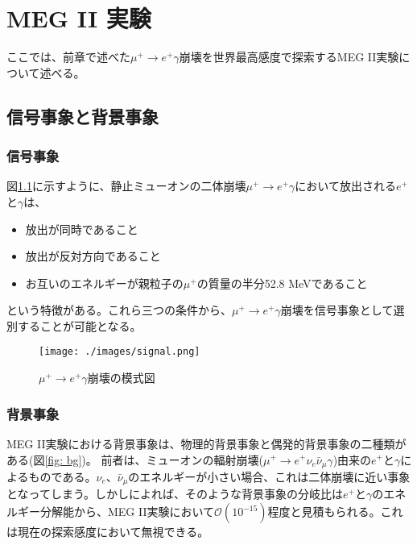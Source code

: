 \documentclass[Yonemoto_master.tex]{subfiles}
\begin{document}
\chapter{MEG II 実験}
ここでは、前章で述べた$\mu^+ \to e^+ \gamma$崩壊を世界最高感度で探索するMEG II実験について述べる。

\section{信号事象と背景事象}

\subsection{信号事象}
図\ref{fig: signal}に示すように、静止ミューオンの二体崩壊$\mu^+ \to e^+ \gamma$において放出される$e^+$と$\gamma$は、

\begin{itemize}
\item 放出が同時であること
\item 放出が反対方向であること
\item お互いのエネルギーが親粒子の$\mu^+$の質量の半分52.8 MeVであること
\end{itemize}

という特徴がある。これら三つの条件から、$\mu^+ \to e^+ \gamma$崩壊を信号事象として選別することが可能となる。
\begin{figure}[h]
 \begin{center}
  \texttt{[image: ./images/signal.png]}
  \caption{$\mu^+ \to e^+ \gamma$崩壊の模式図}
  \label{fig: signal}
 \end{center}
\end{figure}

\subsection{背景事象}
MEG II実験における背景事象は、物理的背景事象と偶発的背景事象の二種類がある(図\ref{fig: bg})。
前者は、ミューオンの輻射崩壊($\mu^+ \to e^+\nu_e\bar{\nu}_{\mu}\gamma$)由来の$e^+$と$\gamma$によるものである。$\nu_e$、$\bar{\nu}_{\mu}$のエネルギーが小さい場合、これは二体崩壊に近い事象となってしまう。しかし\cite{phys_bg}によれば、そのような背景事象の分岐比は$e^+$と$\gamma$のエネルギー分解能から、MEG II実験において$\mathcal{O}(10^{-15})$程度と見積もられる。これは現在の探索感度において無視できる。
\end{document}
